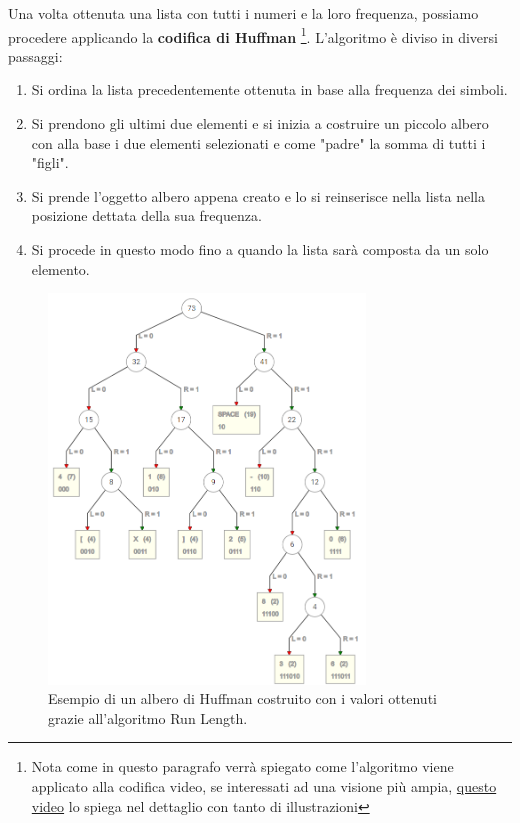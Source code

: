 \documentclass[a4paper,12pt, oneside]{article}
\begin{document}
Una volta ottenuta una lista con tutti i numeri e la loro frequenza, possiamo procedere applicando
la \textbf{codifica di Huffman} \footnote{Nota come in questo paragrafo verrà spiegato come l'algoritmo
viene applicato alla codifica video, se interessati ad una visione più ampia,
\href{https://www.youtube.com/watch?v=JsTptu56GM8}{questo video} lo spiega nel dettaglio con tanto
di illustrazioni}. L'algoritmo è diviso in diversi passaggi:

\begin{enumerate}
    \item Si ordina la lista precedentemente ottenuta in base alla frequenza dei simboli.
    \item Si prendono gli ultimi due elementi e si inizia a costruire un piccolo albero con alla base i due
    elementi selezionati e come "padre" la somma di tutti i "figli".
    \item Si prende l'oggetto albero appena creato e lo si reinserisce nella lista nella posizione dettata
    della sua frequenza.
    \item Si procede in questo modo fino a quando la lista sarà composta da un solo elemento.
\end{enumerate}

\begin{figure}[h]
    \centering
    \includegraphics[width=0.75\textwidth]{images/huffman-tree.png}
    \caption{Esempio di un albero di Huffman costruito con i valori ottenuti grazie all'algoritmo
    Run Length.}
    \label{fig:huffman_tree}
\end{figure}
\end{document}
